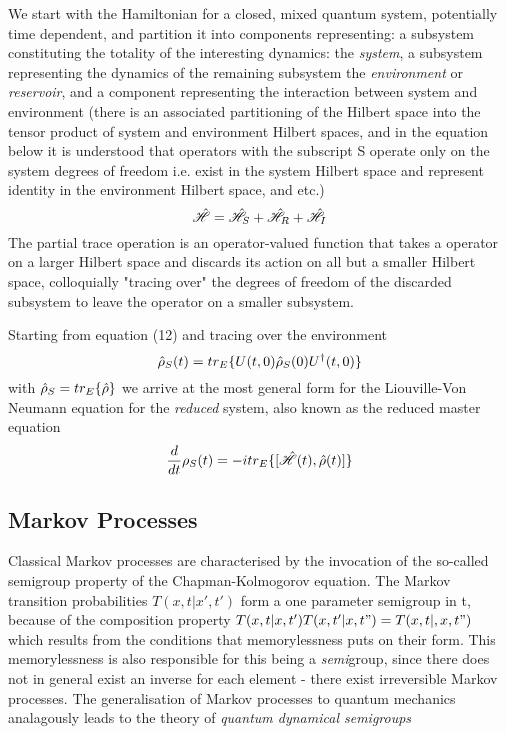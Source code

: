 We start with the Hamiltonian for a closed, mixed quantum system, potentially time dependent, and partition it into components representing: a subsystem constituting the totality of the interesting dynamics: the \emph{system}, a subsystem representing the dynamics of the remaining subsystem the \emph{environment} or \emph{reservoir}, and a component representing the interaction between system and environment (there is an associated partitioning of the Hilbert space into the tensor product of system and environment Hilbert spaces, and in the equation below it is understood that operators with the subscript S operate only on the system degrees of freedom i.e. exist in the system Hilbert space and represent identity in the environment Hilbert space, and etc.)
\begin{equation}
	\hat{\mathscr{H}} = \hat{\mathscr{H}}_S +\hat{\mathscr{H}}_R + \hat{\mathscr{H}}_I
\end{equation}
The partial trace operation is an operator-valued function that takes a operator on a larger Hilbert space and discards its action on all but a smaller Hilbert space, colloquially "tracing over" the degrees of freedom of the discarded subsystem to leave the operator on a smaller subsystem.

Starting from equation (12) and tracing over the environment
\begin{equation}
	\hat{\rho}_S (t) = tr_E \{U(t, 0) \hat{\rho}_S (0) U^\dagger (t, 0) \}
\end{equation}
with $\hat{\rho}_S = tr_E\{\hat{\rho}\}$ we arrive at the most general form for the Liouville-Von Neumann equation for the \emph{reduced} system, also known as the reduced master equation
\begin{equation}
	\frac{d}{dt} \rho_S (t) = -itr_E\{[\hat{\mathscr{H}}(t), \hat{\rho}(t)]\}
\end{equation}
\subsection{Markov Processes}
Classical Markov processes are characterised by the invocation of the so-called semigroup property of the Chapman-Kolmogorov equation. The Markov transition probabilities $T(x, t|x', t')$ form a one parameter semigroup in t, because of the composition property $T(x, t|x, t')T(x, t'|x, t") = T(x, t|,x, t")$ which results from the conditions that memorylessness puts on their form. This memorylessness is also responsible for this being a \emph{semi}group, since there does not in general exist an inverse for each element - there exist irreversible Markov processes. 
The generalisation of Markov processes to quantum mechanics analagously leads to the theory of \emph{quantum dynamical semigroups}

